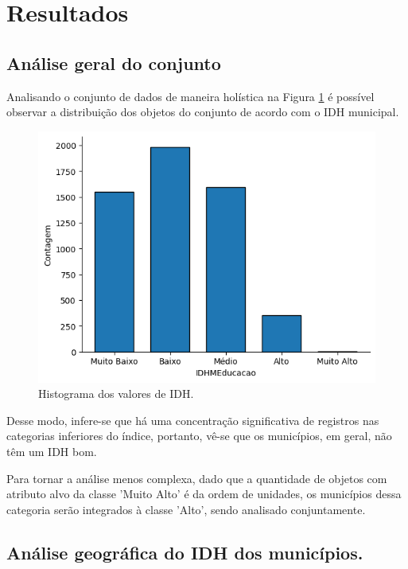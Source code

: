 \section{Resultados}

\subsection{Análise geral do conjunto}

\par Analisando o conjunto de dados de maneira holística na 
Figura \ref{fig:hist-idh} é possível observar a distribuição dos objetos do conjunto de acordo com o IDH municipal.

\begin{figure}[H]
    \centering
    \includegraphics[scale = 0.7]{Graphics/DistribuicaoIDH.png}
    \caption{Histograma dos valores de IDH.}
    \label{fig:hist-idh}
\end{figure}

\par Desse modo, infere-se que há uma concentração significativa de registros nas categorias inferiores do índice, portanto, vê-se que os municípios, em geral, não têm um IDH bom.

\par Para tornar a análise menos complexa, dado que a quantidade de objetos com atributo alvo da classe 'Muito Alto' é da ordem de unidades, os municípios dessa categoria serão integrados à classe 'Alto', sendo analisado conjuntamente.

\subsection{Análise geográfica do IDH dos municípios.}

